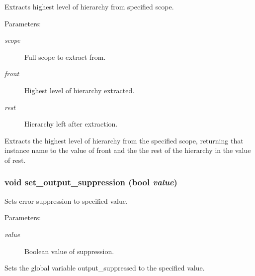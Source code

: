 Extracts highest level of hierarchy from specified scope.

\begin{Desc}
\item[Parameters: ]\par
\begin{description}
\item[{\em 
scope}]Full scope to extract from. \item[{\em 
front}]Highest level of hierarchy extracted. \item[{\em 
rest}]Hierarchy left after extraction.\end{description}
\end{Desc}
Extracts the highest level of hierarchy from the specified scope, returning that instance name to the value of front and the the rest of the hierarchy in the value of rest. 
\subsubsection{\setlength{\rightskip}{0pt plus 5cm}void set\_\-output\_\-suppression ({\bf bool} {\em value})}\label{util_8h_a0}


Sets error suppression to specified value.

\begin{Desc}
\item[Parameters: ]\par
\begin{description}
\item[{\em 
value}]Boolean value of suppression.\end{description}
\end{Desc}
Sets the global variable output\_\-suppressed to the specified value. 